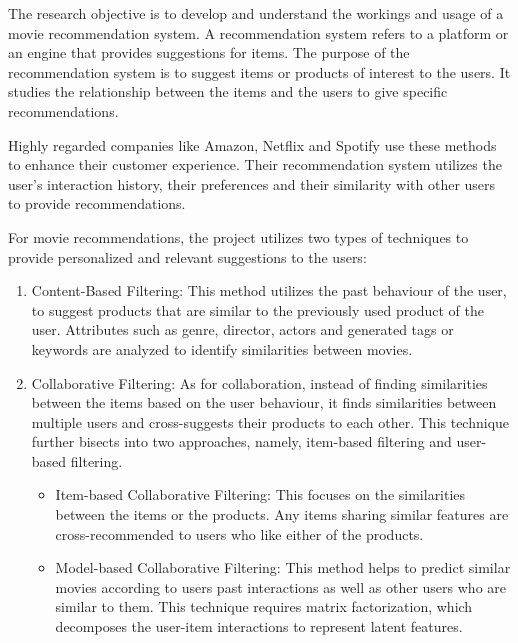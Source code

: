 \documentclass[a4paper,10pt]{article}
\begin{document}
The research objective is to develop and understand the workings and usage of a movie recommendation system. A recommendation system refers to a platform or an engine that provides suggestions for items. The purpose of the recommendation system is to suggest items or products of interest to the users. It studies the relationship between the items and the users to give specific recommendations.

Highly regarded companies like Amazon, Netflix and Spotify use these methods to enhance their customer experience. Their recommendation system utilizes the user's interaction history, their preferences and their similarity with other users to provide recommendations.

For movie recommendations, the project utilizes two types of techniques to provide personalized and relevant suggestions to the users:

\begin{enumerate}
    \item Content-Based Filtering: This method utilizes the past behaviour of the user, to suggest products that are similar to the previously used product of the user. Attributes such as genre, director, actors and generated tags or keywords are analyzed to identify similarities between movies.

    \item Collaborative Filtering: As for collaboration, instead of finding similarities between the items based on the user behaviour, it finds similarities between multiple users and cross-suggests their products to each other. This technique further bisects into two approaches, namely, item-based filtering and user-based filtering.
    \begin{itemize}
        \item Item-based Collaborative Filtering: This focuses on the similarities between the items or the products. Any items sharing similar features are cross-recommended to users who like either of the products.

        \item Model-based Collaborative Filtering:
        This method helps to predict similar movies according to users past interactions as well as other users who are similar to them. This technique requires matrix factorization, which decomposes the user-item interactions to represent latent features.

    \end{itemize}
    
\end{enumerate}
\end{document}
